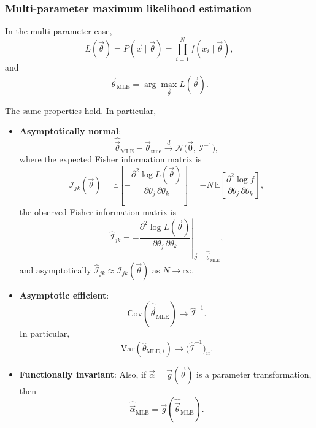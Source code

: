 \documentclass[11pt, titlepage]{article} %
\numberwithin{equation}{section}
\theoremstyle{definition}
\numberwithin{assumption}{section}
\begin{document}
\subsubsection*{Multi-parameter maximum likelihood estimation}

In the multi-parameter case,
\begin{equation*}
    L(\vec \theta)=P(\vec x\mid \vec \theta)=\prod_{i=1}^N f(x_i\mid \vec \theta),
\end{equation*}
and
\begin{equation*}
    \hat{\vec \theta}_{\mathrm{MLE}}=\arg\max_{\vec \theta}L(\vec \theta).
\end{equation*}

The same properties hold. In particular,

\begin{itemize}
    \item \textbf{Asymptotically normal}:
\begin{equation*}
    \hat{\vec \theta}_{\mathrm{MLE}}-\vec \theta_{\mathrm{true}}
    \overset{d}{\longrightarrow}
    \mathcal{N}\bigl(\vec 0,\,\mathcal{I}^{-1}\bigr),
\end{equation*}
where the expected Fisher information matrix is
\begin{equation*}
    \mathcal{I}_{jk}(\vec \theta)
    =\mathbb{E}\!\left[
    -\frac{\partial^2 \log L(\vec \theta)}{\partial \theta_j\,\partial \theta_k}
    \right]
    =-N\,\mathbb{E}\!\left[
    \frac{\partial^2 \log f}{\partial \theta_j\,\partial \theta_k}
    \right],
\end{equation*}
the observed Fisher information matrix is
\begin{equation*}
    \hat{\mathcal{I}}_{jk}
    =-\left.
    \frac{\partial^2 \log L(\vec \theta)}{\partial \theta_j\,\partial \theta_k}
    \right|_{\vec \theta=\hat{\vec \theta}_{\mathrm{MLE}}},
\end{equation*}
and asymptotically $\hat{\mathcal{I}}_{jk}\approx \mathcal{I}_{jk}(\vec \theta)$ as $N\to\infty$.

\item \textbf{Asymptotic efficient}:
\begin{equation*}
    \mathrm{Cov}(\hat{\vec \theta}_{\mathrm{MLE}})\to \hat{\mathcal{I}}^{-1}.
\end{equation*}
In particular,
\begin{equation*}
    \mathrm{Var}(\hat{\theta}_{\mathrm{MLE},i})
    \to
    \bigl(\hat{\mathcal{I}}^{-1}\bigr)_{ii}.
\end{equation*}

\item \textbf{Functionally invariant}:
Also, if $\vec \alpha=\vec g(\vec \theta)$ is a parameter transformation, then
\begin{equation*}
    \hat{\vec \alpha}_{\mathrm{MLE}}=\vec g(\hat{\vec \theta}_{\mathrm{MLE}}).
\end{equation*}
\end{itemize}
\end{document}

